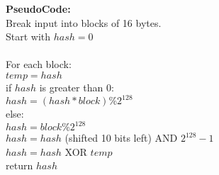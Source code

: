 \documentclass{article}
\begin{document}
\textbf{PseudoCode: } \\
Break input into blocks of 16 bytes. \\
Start with $hash = 0$ \\\\
For each block: \\
\-\hspace{1cm}    $temp = hash$\\
\-\hspace{1cm}    if $hash$ is greater than $0$:\\
\-\hspace{2cm}    $hash = (hash * block) \% 2^{128}$ \\
\-\hspace{1cm}    else:\\
\-\hspace{2cm}    $hash = block \% 2^{128}$ \\
\-\hspace{2cm}    $hash = hash$ (shifted 10 bits left) AND $2^{128}-1$\\
\-\hspace{2cm}    $hash = hash$ XOR $temp$ \\
return $hash$
\end{document}

